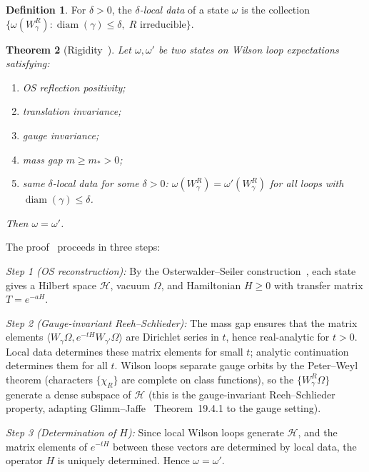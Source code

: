 \documentclass[11pt,a4paper]{article}
\theoremstyle{plain}
\newtheorem{theorem}{Theorem}[section]
\theoremstyle{definition}
\newtheorem{definition}[theorem]{Definition}
\theoremstyle{remark}
\newcommand{\diam}{\operatorname{diam}}
\newcommand{\cH}{\mathcal{H}}
\begin{document}
\begin{definition}
For $\delta > 0$, the \emph{$\delta$-local data}
of a state $\omega$ is the collection
$\{\omega(W_\gamma^R) : \diam(\gamma) \le \delta,\;
R \text{ irreducible}\}$.
\end{definition}

\begin{theorem}[Rigidity~\cite{FontesEuclidean}]
\label{thm:rigidity}
Let $\omega, \omega'$ be two states on Wilson loop
expectations satisfying:
\begin{enumerate}[label=(\alph*),nosep]
  \item OS reflection positivity;
  \item translation invariance;
  \item gauge invariance;
  \item mass gap $m \ge m_* > 0$;
  \item same $\delta$-local data for some $\delta > 0$:
    $\omega(W_\gamma^R) = \omega'(W_\gamma^R)$ for
    all loops with $\diam(\gamma) \le \delta$.
\end{enumerate}
Then $\omega = \omega'$.
\end{theorem}

The proof~\cite{FontesEuclidean} proceeds in three steps:

\medskip\noindent
\emph{Step 1 (OS reconstruction):}
By the Osterwalder--Seiler construction~\cite{OS78},
each state gives a Hilbert space $\cH$, vacuum $\Omega$,
and Hamiltonian $H \ge 0$ with transfer matrix
$T = e^{-aH}$.

\medskip\noindent
\emph{Step 2 (Gauge-invariant Reeh--Schlieder):}
The mass gap ensures that the matrix elements
$\langle W_\gamma \Omega, e^{-tH} W_{\gamma'} \Omega \rangle$
are Dirichlet series in $t$, hence real-analytic for $t > 0$.
Local data determines these matrix elements for small $t$;
analytic continuation determines them for all $t$.
Wilson loops separate gauge orbits by the Peter--Weyl theorem
(characters $\{\chi_R\}$ are complete on class functions),
so the $\{W_\gamma^R \Omega\}$ generate a dense subspace
of $\cH$ (this is the gauge-invariant Reeh--Schlieder
property, adapting Glimm--Jaffe~\cite{GJ87} Theorem~19.4.1
to the gauge setting).

\medskip\noindent
\emph{Step 3 (Determination of $H$):}
Since local Wilson loops generate $\cH$, and the matrix
elements of $e^{-tH}$ between these vectors are determined
by local data, the operator $H$ is uniquely determined.
Hence $\omega = \omega'$.
\end{document}
